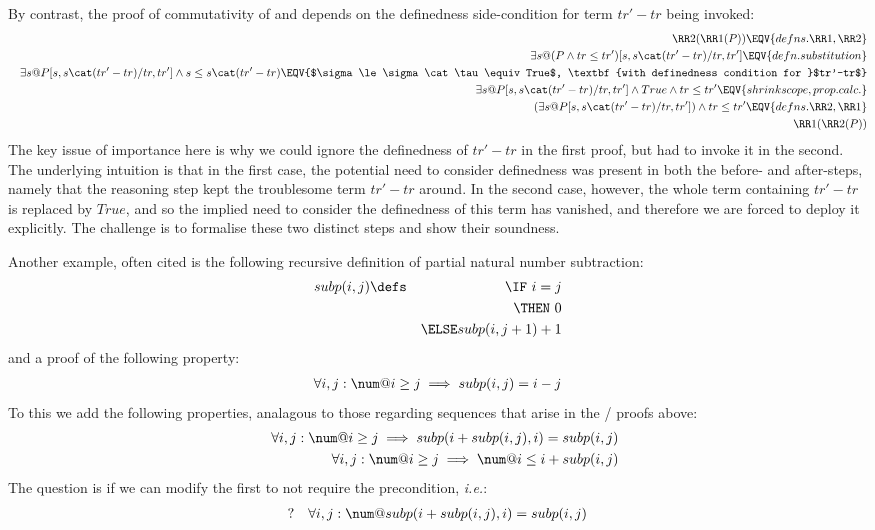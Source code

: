 By contrast, the proof of commutativity of  and 
depends on the definedness side-condition for term $tr'-tr$
being invoked:
\begin{eqnarray*}
  && \RR2(\RR1(P))
\EQV{defns. \RR1, \RR2}
\\&& \exists s @ (P \land tr \le tr')[s,s\cat(tr'-tr)/tr,tr']
\EQV{defn. substitution}
\\&& \exists s @ P[s,s\cat(tr'-tr)/tr,tr'] \land s \le s\cat(tr'-tr)
\EQV{$\sigma \le \sigma\cat\tau \equiv True$, \textbf{with definedness condition for }$tr'-tr$}
\\&& \exists s @ P[s,s\cat(tr'-tr)/tr,tr'] \land True \land tr \le tr'
\EQV{shrink scope, prop. calc.}
\\&& (\exists s @ P[s,s\cat(tr'-tr)/tr,tr']) \land tr \le tr'
\EQV{defns. \RR2, \RR1}
\\&& \RR1(\RR2(P))
\end{eqnarray*}
The key issue of importance here is why we could ignore the definedness
of $tr'-tr$ in the first proof, but had to invoke it in the second.
The underlying intuition is that in the first case,
the potential need to consider definedness was present
in both the before- and after-steps, namely that the reasoning
step kept the troublesome term $tr'-tr$ around.
In the second case, however, the whole term containing $tr'-tr$
is replaced by $True$, and so the implied need to consider the definedness
of this term has vanished, and therefore we are forced to deploy it explicitly.
The challenge is to formalise these two distinct steps and show their
soundness.

Another example,
often cited is the following recursive definition
of partial natural number subtraction:
\begin{eqnarray*}
   subp(i,j) &\defs& \IF~i=j
\\ && \THEN~0
\\&& \ELSE subp(i,j+1)+1
\end{eqnarray*}
and a proof of the following property:
\begin{eqnarray*}
   \forall i,j : \num @ i \ge j \implies subp(i,j) = i-j
\end{eqnarray*}
To this we add the following properties,
analagous to those regarding sequences
that arise in the / proofs above:
\begin{eqnarray*}
  && \forall i,j :\num @ i \ge j \implies subp(i+subp(i,j),i) = subp(i,j)
\\ && \forall i,j : \num @ i \ge j \implies \num @ i \le i + subp(i,j)
\end{eqnarray*}
The question is if we can modify the first
to not require the precondition, \emph{i.e.}:
\begin{eqnarray*}
  ? && \forall i,j :\num @ subp(i+subp(i,j),i) = subp(i,j)
\end{eqnarray*}

